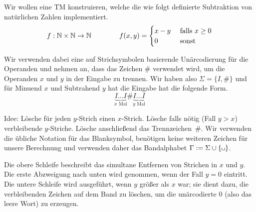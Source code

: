 \begin{Bsp}
Wir wollen eine \ac{TM} konstruieren, welche die wie folgt definierte Subtraktion von natürlichen Zahlen implementiert.
% 
% 
$$
f: \mathbb{N}\times\mathbb{N}\rightarrow \mathbb{N}
\qquad \qquad
f(x,y)=
\begin{cases}
 x - y & \text{ falls } x\geq 0\\
 0  & \text{ sonst}
\end{cases}
$$

Wir verwenden dabei eine auf Strichsymbolen basierende Unärcodierung für die Operanden
und nehmen an, dass das Zeichen $\#$ verwendet wird, um die Operanden $x$ und $y$ in der Eingabe zu trennen.
Wir haben also $\Sigma=\{I,\#\}$ und für Minuend $x$ und Subtrahend $y$ hat die Eingabe hat die folgende Form. 
$$\underbrace{I\ldots I}_{x\text{ Mal}}\#\underbrace{I\ldots I}_{y\text{ Mal}}$$


Idee: Lösche für jeden $y$-Strich einen $x$-Strich.
Lösche falls nötig (Fall $y>x$) verbleibende $y$-Striche. Lösche anschließend das Trennzeichen~$\#$.
Wir verwenden die übliche Notation für das Blanksymbol, 
benötigen keine weiteren Zeichen für unsere Berechnung und verwenden daher das Bandalphabet $\Gamma:=\Sigma\cup\{\mblank\}$.

  
  Die obere Schleife beschreibt das simultane Entfernen von Strichen in $x$ und $y$.
  Die erste Abzweigung nach unten wird genommen, wenn der Fall $y=0$ eintritt.
  Die untere Schleife wird ausgeführt, wenn $y$ größer als $x$ war; sie dient dazu, die verbleibenden Zeichen auf dem Band zu löschen, 
  um die unärcodierte $0$ (also das leere Wort) zu erzeugen.
\end{Bsp}
  
